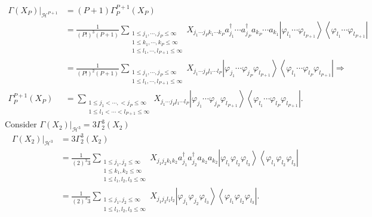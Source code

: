 \documentclass[aps,preprint]{revtex4}%
\begin{document}
\begin{align}
\left.  \Gamma\left(  X_{P}\right)  \right\vert _{\mathcal{H}^{P+1}}  &
=\left(  P+1\right)  \Gamma_{P}^{P+1}\left(  X_{P}\right) \\
&  =\frac{1}{\left(  P!\right)  ^{3}\left(  P+1\right)  }\sum_{\substack{1\leq
j_{1},\cdots,j_{P}\leq\infty\\1\leq k_{1},\cdots,k_{P}\leq\infty\\1\leq
l_{1},\cdots,l_{P+1}\leq\infty}}X_{j_{1}\cdots j_{P}k_{1}\cdots k_{P}}%
a_{j_{1}}^{\dagger}\cdots a_{j_{P}}^{\dagger}a_{k_{P}}\cdots a_{k_{1}%
}\left\vert \varphi_{l_{1}}\cdots\varphi_{l_{P+1}}\right\rangle \left\langle
\varphi_{l_{1}}\cdots\varphi_{l_{P+1}}\right\vert \\
&  =\frac{1}{\left(  P!\right)  ^{2}\left(  P+1\right)  }\sum_{\substack{1\leq
j_{1},\cdots,j_{P}\leq\infty\\1\leq l_{1},\cdots,l_{P+1}\leq\infty}%
}X_{j_{1}\cdots j_{P}l_{1}\cdots l_{P}}\left\vert \varphi_{j_{1}}\cdots
\varphi_{j_{P}}\varphi_{l_{P+1}}\right\rangle \left\langle \varphi_{l_{1}%
}\cdots\varphi_{l_{P}}\varphi_{l_{P+1}}\right\vert \Rightarrow\\
\Gamma_{P}^{P+1}\left(  X_{P}\right)   &  =\sum_{\substack{1\leq j_{1}%
<\cdots,<j_{P}\leq\infty\\1\leq l_{1}<\cdots<l_{P+1}\leq\infty}}X_{j_{1}\cdots
j_{P}l_{1}\cdots l_{P}}\left\vert \varphi_{j_{1}}\cdots\varphi_{j_{P}}%
\varphi_{l_{P+1}}\right\rangle \left\langle \varphi_{l_{1}}\cdots
\varphi_{l_{P}}\varphi_{l_{P+1}}\right\vert .
\end{align}
Consider $\left.  \Gamma\left(  X_{2}\right)  \right\vert _{\mathcal{H}^{3}%
}=3\Gamma_{2}^{3}\left(  X_{2}\right)  $
\begin{align}
\left.  \Gamma\left(  X_{2}\right)  \right\vert _{\mathcal{H}^{3}}  &
=3\Gamma_{2}^{3}\left(  X_{2}\right) \\
&  =\frac{1}{\left(  2\right)  ^{3}3}\sum_{\substack{1\leq j_{1},j_{2}%
\leq\infty\\1\leq k_{1},k_{2}\leq\infty\\1\leq l_{1},l_{2},l_{3}\leq\infty
}}X_{j_{1}j_{2}k_{1}k_{2}}a_{j_{1}}^{\dagger}a_{j_{2}}^{\dagger}a_{k_{2}%
}a_{k_{2}}\left\vert \varphi_{l_{1}}\varphi_{l_{2}}\varphi_{l_{3}%
}\right\rangle \left\langle \varphi_{l_{1}}\varphi_{l_{2}}\varphi_{l_{3}%
}\right\vert \\
&  =\frac{1}{\left(  2\right)  ^{3}3}\sum_{\substack{1\leq j_{1},j_{2}%
\leq\infty\\1\leq l_{1},l_{2},l_{3}\leq\infty}}X_{j_{1}j_{2}l_{1}l_{2}%
}\left\vert \varphi_{j_{1}}\varphi_{j_{2}}\varphi_{l_{3}}\right\rangle
\left\langle \varphi_{l_{1}}\varphi_{l_{2}}\varphi_{l_{3}}\right\vert .
\end{align}
\end{document}
